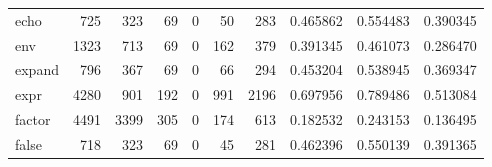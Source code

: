 \begin{longtable}{lrrrrrrrrr}
echo      &                                                725 &                                                323 &                                                 69 &                                                  0 &                                                 50 &                                                283 &                                           0.465862 &                               0.554483 &                             0.390345 \\
env       &                                               1323 &                                                713 &                                                 69 &                                                  0 &                                                162 &                                                379 &                                           0.391345 &                               0.461073 &                             0.286470 \\
expand    &                                                796 &                                                367 &                                                 69 &                                                  0 &                                                 66 &                                                294 &                                           0.453204 &                               0.538945 &                             0.369347 \\
expr      &                                               4280 &                                                901 &                                                192 &                                                  0 &                                                991 &                                               2196 &                                           0.697956 &                               0.789486 &                             0.513084 \\
factor    &                                               4491 &                                               3399 &                                                305 &                                                  0 &                                                174 &                                                613 &                                           0.182532 &                               0.243153 &                             0.136495 \\
false     &                                                718 &                                                323 &                                                 69 &                                                  0 &                                                 45 &                                                281 &                                           0.462396 &                               0.550139 &                             0.391365 \\

\end{longtable}
